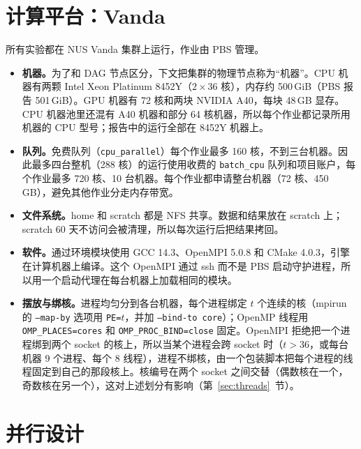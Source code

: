 \documentclass[11pt,a4paper,UTF8,fontset=fandol]{ctexart}
\newcommand{\code}[1]{\texttt{#1}}
\begin{document}
\section{计算平台：Vanda}
\label{sec:platform}
所有实验都在 NUS Vanda 集群上运行，作业由 PBS 管理。
\begin{itemize}[nosep]
  \item \textbf{机器。}为了和 DAG 节点区分，下文把集群的物理节点称为“机器”。CPU 机器有两颗 Intel Xeon Platinum 8452Y（$2\times36$ 核），内存约 500\,GiB（PBS 报告 501\,GiB）。GPU 机器有 72 核和两块 NVIDIA A40，每块 48\,GB 显存。CPU 机器池里还混有 A40 机器和部分 64 核机器，所以每个作业都记录所用机器的 CPU 型号；报告中的运行全部在 8452Y 机器上。
  \item \textbf{队列。}免费队列（\code{cpu\_parallel}）每个作业最多 160 核，不到三台机器。因此最多四台整机（288 核）的运行使用收费的 \code{batch\_cpu} 队列和项目账户，每个作业最多 720 核、10 台机器。每个作业都申请整台机器（72 核、450\,GB），避免其他作业分走内存带宽。
  \item \textbf{文件系统。}home 和 scratch 都是 NFS 共享。数据和结果放在 scratch 上；scratch 60 天不访问会被清理，所以每次运行后把结果拷回。
  \item \textbf{软件。}通过环境模块使用 GCC 14.3、OpenMPI 5.0.8 和 CMake 4.0.3，引擎在计算机器上编译。这个 OpenMPI 通过 ssh 而不是 PBS 启动守护进程，所以用一个启动代理在每台机器上加载相同的模块。
  \item \textbf{摆放与绑核。}进程均匀分到各台机器，每个进程绑定 $t$ 个连续的核（mpirun 的 \code{--map-by} 选项用 \code{PE=$t$}，并加 \code{--bind-to core}）；OpenMP 线程用 \code{OMP\_PLACES=cores} 和 \code{OMP\_PROC\_BIND=close} 固定。OpenMPI 拒绝把一个进程绑到两个 socket 的核上，所以当某个进程会跨 socket 时（$t>36$，或每台机器 9 个进程、每个 8 线程），进程不绑核，由一个包装脚本把每个进程的线程固定到自己的那段核上。核编号在两个 socket 之间交替（偶数核在一个，奇数核在另一个），这对上述划分有影响（第~\ref{sec:threads}~节）。
\end{itemize}

\section{并行设计}

\setcounter{subsection}{-1}
\end{document}

